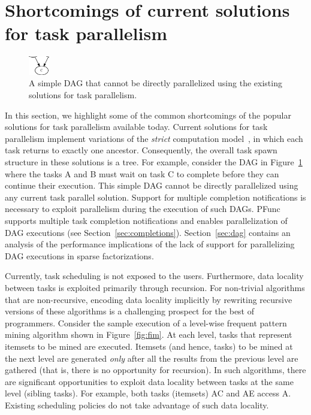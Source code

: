 \documentclass{sig-alternate}
\begin{document}
%
\section{Shortcomings of current solutions for task parallelism}
\label{sec:shortcomings}
\begin{figure}[t] 
\centering 
\includegraphics[width=0.08\textwidth]{figs/dag}
\caption{A simple DAG that cannot be directly parallelized using
the existing solutions for task parallelism.} 
\label{fig:dag} 
\end{figure}

In this section, we highlight some of the common shortcomings of the popular
solutions for task parallelism available today.  Current solutions for task
parallelism implement variations of the \textit{strict} computation
model~\cite{Blumofe94}, in which each task returns to exactly one ancestor.
Consequently, the overall task spawn structure in these solutions is a tree.
For example, consider the DAG in Figure~\ref{fig:dag} where the tasks A and B
must wait on task C to complete before they can continue their execution. This
simple DAG cannot be directly parallelized using any current task parallel
solution.  Support for multiple completion notifications is necessary to
exploit parallelism during the execution of such DAGs.  PFunc supports multiple
task completion notifications and enables parallelization of DAG executions
(see Section~\ref{sec:completions}).  Section~\ref{sec:dag} contains an
analysis of the performance implications of the lack of support for
parallelizing DAG executions in sparse factorizations.

Currently, task scheduling is not exposed to the users. Furthermore, data
locality between tasks is exploited primarily through recursion.  For
non-trivial algorithms that are non-recursive, encoding data locality
implicitly by rewriting recursive versions 
of these algorithms is a challenging
prospect for the best of programmers.
%
Consider the sample execution of a level-wise frequent pattern mining algorithm
shown in Figure~\ref{fig:fim}. At each level, tasks that represent itemsets to
be mined are executed. Itemsets (and hence, tasks) to be mined at the next
level are generated \textit{only} after all the results from the previous
level are gathered (that is, there is no opportunity for recursion). In such
algorithms, there are significant opportunities to exploit data locality
between tasks at the same level (sibling tasks). For example, both tasks
(itemsets) AC and AE access A.  Existing scheduling policies do not take
advantage of such data locality.
\end{document}
